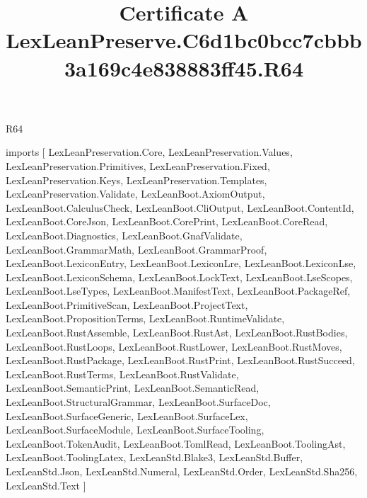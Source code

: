 \begin{lexlean}{R64}
\title{Certificate A LexLeanPreserve.C6d1bc0bcc7cbbb3a169c4e838883ff45.R64}
\begin{coremodule}
imports [
  LexLeanPreservation.Core,
  LexLeanPreservation.Values,
  LexLeanPreservation.Primitives,
  LexLeanPreservation.Fixed,
  LexLeanPreservation.Keys,
  LexLeanPreservation.Templates,
  LexLeanPreservation.Validate,
  LexLeanBoot.AxiomOutput,
  LexLeanBoot.CalculusCheck,
  LexLeanBoot.CliOutput,
  LexLeanBoot.ContentId,
  LexLeanBoot.CoreJson,
  LexLeanBoot.CorePrint,
  LexLeanBoot.CoreRead,
  LexLeanBoot.Diagnostics,
  LexLeanBoot.GnafValidate,
  LexLeanBoot.GrammarMath,
  LexLeanBoot.GrammarProof,
  LexLeanBoot.LexiconEntry,
  LexLeanBoot.LexiconLre,
  LexLeanBoot.LexiconLse,
  LexLeanBoot.LexiconSchema,
  LexLeanBoot.LockText,
  LexLeanBoot.LseScopes,
  LexLeanBoot.LseTypes,
  LexLeanBoot.ManifestText,
  LexLeanBoot.PackageRef,
  LexLeanBoot.PrimitiveScan,
  LexLeanBoot.ProjectText,
  LexLeanBoot.PropositionTerms,
  LexLeanBoot.RuntimeValidate,
  LexLeanBoot.RustAssemble,
  LexLeanBoot.RustAst,
  LexLeanBoot.RustBodies,
  LexLeanBoot.RustLoops,
  LexLeanBoot.RustLower,
  LexLeanBoot.RustMoves,
  LexLeanBoot.RustPackage,
  LexLeanBoot.RustPrint,
  LexLeanBoot.RustSucceed,
  LexLeanBoot.RustTerms,
  LexLeanBoot.RustValidate,
  LexLeanBoot.SemanticPrint,
  LexLeanBoot.SemanticRead,
  LexLeanBoot.StructuralGrammar,
  LexLeanBoot.SurfaceDoc,
  LexLeanBoot.SurfaceGeneric,
  LexLeanBoot.SurfaceLex,
  LexLeanBoot.SurfaceModule,
  LexLeanBoot.SurfaceTooling,
  LexLeanBoot.TokenAudit,
  LexLeanBoot.TomlRead,
  LexLeanBoot.ToolingAst,
  LexLeanBoot.ToolingLatex,
  LexLeanStd.Blake3,
  LexLeanStd.Buffer,
  LexLeanStd.Json,
  LexLeanStd.Numeral,
  LexLeanStd.Order,
  LexLeanStd.Sha256,
  LexLeanStd.Text
]


\end{coremodule}
\end{lexlean}

